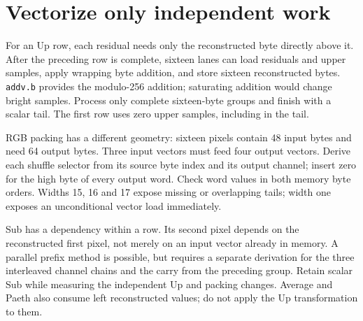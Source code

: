 \section{Vectorize only independent work}
For an Up row, each residual needs only the reconstructed byte directly above it.
After the preceding row is complete, sixteen lanes can load residuals and upper
samples, apply wrapping byte addition, and store sixteen reconstructed bytes.
\texttt{addv.b} provides the modulo-256 addition; saturating addition would change
bright samples. Process only complete sixteen-byte groups and finish with a scalar
tail. The first row uses zero upper samples, including in the tail.

RGB packing has a different geometry: sixteen pixels contain 48 input bytes and need
64 output bytes. Three input vectors must feed four output vectors. Derive each
shuffle selector from its source byte index and its output channel; insert zero for
the high byte of every output word. Check word values in both memory byte orders.
Widths 15, 16 and 17 expose missing or overlapping tails; width one exposes an
unconditional vector load immediately.

Sub has a dependency within a row. Its second pixel depends on the reconstructed
first pixel, not merely on an input vector already in memory. A parallel prefix
method is possible, but requires a separate derivation for the three interleaved
channel chains and the carry from the preceding group. Retain scalar Sub while
measuring the independent Up and packing changes. Average and Paeth also consume
left reconstructed values; do not apply the Up transformation to them.
